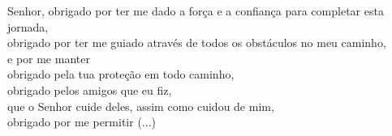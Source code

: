 
Senhor, obrigado por ter me dado a força e a confiança para completar esta jornada,\\
obrigado por ter me guiado através de todos os obstáculos no meu caminho,\\
e por me manter \\
obrigado pela tua proteção em todo caminho,\\
obrigado pelos amigos que eu fiz,\\
que o Senhor cuide deles, assim como cuidou de mim,\\
obrigado por me permitir (...)
